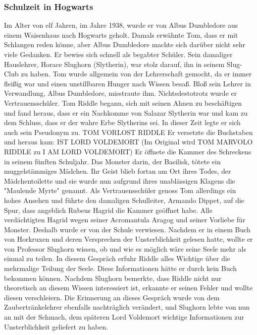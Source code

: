 \documentclass[a4paper, 10pt]{article}
\begin{document}
\subsubsection*{\large Schulzeit in Hogwarts}
Im Alter von elf Jahren, im Jahre 1938, wurde er von Albus Dumbledore aus einem Waisenhaus nach Hogwarts geholt. Damals erwähnte Tom, dass er mit Schlangen reden könne, aber Albus Dumbledore machte sich darüber nicht sehr viele Gedanken. Er bewies sich schnell als begabter Schüler. Sein damaliger Hauslehrer, Horace Slughorn (Slytherin), war stolz darauf, ihn in seinem Slug-Club zu haben. Tom wurde allgemein von der Lehrerschaft gemocht, da er immer fleißig war und einen unstillbaren Hunger nach Wissen besaß. Bloß sein Lehrer in Verwandlung, Albus Dumbledore, misstraute ihm. Nichtsdestotrotz wurde er Vertrauensschüler.
\vspace{10pt}
\newline
Tom Riddle begann, sich mit seinen Ahnen zu beschäftigen und fand heraus, dass er ein Nachkomme von Salazar Slytherin war und kam zu dem Schluss, dass er der wahre Erbe Slytherins sei. In dieser Zeit legte er sich auch sein Pseudonym zu.
\vspace{10pt}
\newline
TOM VORLOST RIDDLE
\vspace{10pt}
\newline
Er versetzte die Buchstaben und heraus kam:
\vspace{10pt}
\newline
IST LORD VOLDEMORT
\vspace{10pt}
\newline
(Im Original wird TOM MARVOLO RIDDLE zu I AM LORD VOLDEMORT)
\vspace{10pt}
\newline
Er öffnete die Kammer des Schreckens in seinem fünften Schuljahr. Das Monster darin, der Basilisk, tötete ein muggelstämmiges Mädchen. Ihr Geist blieb fortan am Ort ihres Todes, der Mädchentoilette und sie wurde nun aufgrund ihres unablässigen Klagens die "Maulende Myrte" genannt. Als Vertrauensschüler genoss Tom allerdings ein hohes Ansehen und führte den damaligen Schulleiter, Armando Dippet, auf die Spur, dass angeblich Rubeus Hagrid die Kammer geöffnet habe. Alle verdächtigten Hagrid wegen seiner Acromantula Aragog und seiner Vorliebe für Monster. Deshalb wurde er von der Schule verwiesen.
\vspace{10pt}
\newline
Nachdem er in einem Buch von Horkruxen und deren Versprechen der Unsterblichkeit gelesen hatte, wollte er von Professor Slughorn wissen, ob und wie es möglich wäre seine Seele mehr als einmal zu teilen. In diesem Gespräch erfuhr Riddle alles Wichtige über die mehrmalige Teilung der Seele. Diese Informationen hätte er durch kein Buch bekommen können. Nachdem Slughorn bemerkte, dass Riddle nicht nur theoretisch an diesem Wissen interessiert ist, erkannte er seinen Fehler und wollte diesen verschleiern. Die Erinnerung an dieses Gespräch wurde von dem Zaubertränkelehrer ebenfalls nachträglich verändert, und Slughorn lebte von nun an mit der Schmach, dem späteren Lord Voldemort wichtige Informationen zur Unsterblichkeit geliefert zu haben.
\end{document}
